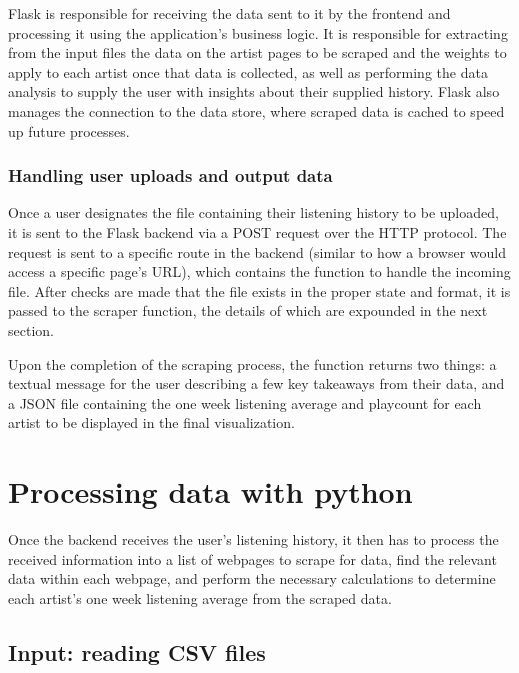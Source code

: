 Flask is responsible for receiving the data sent to it by the frontend and processing it using the application's business logic. It is responsible for extracting from the input files the data on the artist pages to be scraped and the weights to apply to each artist once that data is collected, as well as performing the data analysis to supply the user with insights about their supplied history. Flask also manages the connection to the data store, where scraped data is cached to speed up future processes.

\subsubsection{Handling user uploads and output data}

Once a user designates the file containing their listening history to be uploaded, it is sent to the Flask backend via a POST request over the HTTP protocol. The request is sent to a specific route in the backend (similar to how a browser would access a specific page's URL), which contains the function to handle the incoming file. After checks are made that the file exists in the proper state and format, it is passed to the scraper function, the details of which are expounded in the next section.

Upon the completion of the scraping process, the function returns two things: a textual message for the user describing a few key takeaways from their data, and a JSON file containing the one week listening average and playcount for each artist to be displayed in the final visualization.

\section{Processing data with python}

Once the backend receives the user's listening history, it then has to process the received information into a list of webpages to scrape for data, find the relevant data within each webpage, and perform the necessary calculations to determine each artist's one week listening average from the scraped data.

\subsection{Input: reading CSV files}


